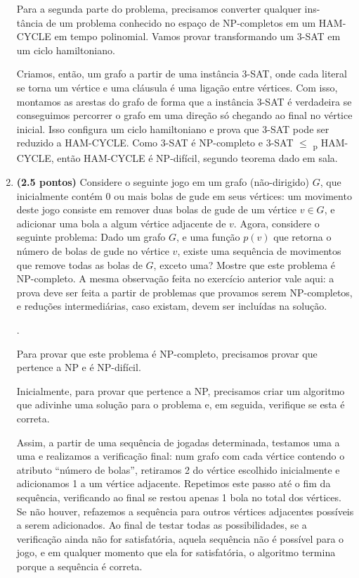 \documentclass[12pt]{article}
\newcommand{\resposta}[1]{ \noindent {\bf Solução}. {\color{blue} #1}}
\begin{document}
\begin{enumerate}
{  Para a segunda parte do problema, precisamos converter qualquer ins-\\tância de um problema conhecido no espaço de NP-completos em um HAM-CYCLE em tempo polinomial. Vamos provar transformando um 3-SAT em um ciclo hamiltoniano.
  
  Criamos, então, um grafo a partir de uma instância 3-SAT, onde cada literal se torna um vértice e uma cláusula é uma ligação entre vértices. Com isso, montamos as arestas do grafo de forma que a instância 3-SAT é verdadeira se conseguimos percorrer o grafo em uma direção só chegando ao final no vértice inicial. Isso configura um ciclo hamiltoniano e prova que 3-SAT pode ser reduzido a HAM-CYCLE. Como 3-SAT é NP-completo e 3-SAT $\leq$ \textsubscript{p} HAM-CYCLE, então HAM-CYCLE é NP-difícil, segundo teorema dado em sala.
  
  }
  
\item {\bf (2.5 pontos)} Considere o seguinte jogo em um grafo
  (não-dirigido) $G$, que inicialmente contém 0 ou mais bolas de gude
  em seus vértices: um movimento deste jogo consiste em remover duas
  bolas de gude de um vértice $v\in G$, e adicionar uma bola a algum
  vértice adjacente de $v$. Agora, considere o seguinte problema: Dado
  um grafo $G$, e uma função $p(v)$ que retorna o número de bolas de
  gude no vértice $v$, existe uma sequência de movimentos que remove
  todas as bolas de $G$, exceto uma? Mostre que este problema é
  NP-completo. A mesma observação feita no exercício anterior vale
  aqui: a prova deve ser feita a partir de problemas que provamos
  serem NP-completos, e reduções intermediárias, caso existam, devem
  ser incluídas na solução.

  \resposta{
    Para provar que este problema é NP-completo, precisamos provar que pertence a NP e é NP-difícil.
    
    Inicialmente, para provar que pertence a NP, precisamos criar um algoritmo que adivinhe uma solução para o problema e, em seguida, verifique se esta é correta.
    
    Assim, a partir de uma sequência de jogadas determinada, testamos uma a uma e realizamos a verificação final: num grafo com cada vértice contendo o atributo ``número de bolas'', retiramos 2 do vértice escolhido inicialmente e adicionamos 1 a um vértice adjacente. Repetimos este passo até o fim da sequência, verificando ao final se restou apenas 1 bola no total dos vértices. Se não houver, refazemos a sequência para outros vértices adjacentes possíveis a serem adicionados. Ao final de testar todas as possibilidades, se a verificação ainda não for satisfatória, aquela sequência não é possível para o jogo, e em qualquer momento que ela for satisfatória, o algoritmo termina porque a sequência é correta.
    
}
\end{enumerate}
\end{document}
